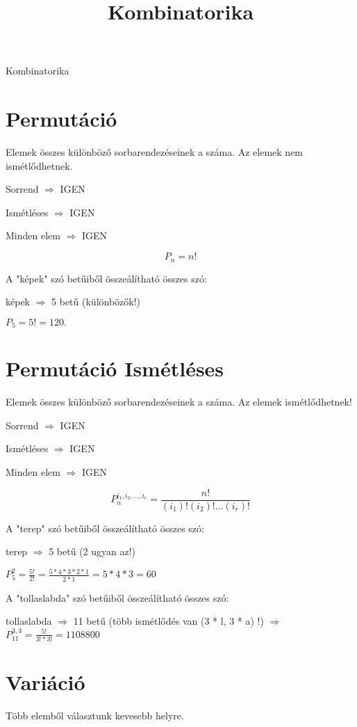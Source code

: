 \documentclass[paper=a4,
fontsize=2.2mm]{scrartcl} \addtokomafont{sectioning}{\rmfamily}
\begin{document}
\noindent
\setlength\parindent{0pt}
\title{Kombinatorika}

\begin{center}
{\huge Kombinatorika}
\end{center}

\section{Permutáció}

Elemek összes különböző sorbarendezéseinek a száma. Az elemek nem ismétlődhetnek.

Sorrend $\Rightarrow$ IGEN

Ismétléses $\Rightarrow$ IGEN

Minden elem $\Rightarrow$ IGEN

$$P_n = n!$$

A "képek" szó betűiből összeálítható összes szó:

képek $\Rightarrow$ 5 betű (különbözők!)

$P_5 = 5! = 120.$

\section{Permutáció Ismétléses}

Elemek összes különböző sorbarendezéseinek a száma. Az elemek ismétlődhetnek!

Sorrend $\Rightarrow$ IGEN

Ismétléses $\Rightarrow$ IGEN

Minden elem $\Rightarrow$ IGEN


$$P_n^{i_1, i_2, ... , i_r} = \frac{n!}{(i_1)!(i_2)! ... (i_r)!}$$

A "terep" szó betűiből összeálítható összes szó:


terep $\Rightarrow$ 5 betű (2 ugyan az!)


$P_5^{2} = \frac{5!}{2!} = \frac{5 * 4 * 3 * 2 * 1}{2 * 1} = 5 * 4 * 3 = 60$


A "tollaslabda" szó betűiből összeálítható összes szó:


tollaslabda $\Rightarrow$ 11 betű (több ismétlődés van (3 * l, 3 * a) !) $\Rightarrow$ $P_{11}^{3, 3} = \frac{5!}{3! * 3!} = 1108800$


\section{Variáció}

Több elemből választunk kevesebb helyre.
\end{document}
